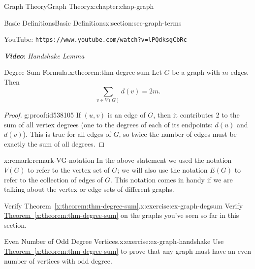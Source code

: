 \documentclass[oneside,10pt,]{book}
\newcommand{\xreffont}{\relax}
\newcommand{\mono}[1]{\texttt{#1}}
\newcommand{\alert}[1]{\textbf{\textit{#1}}}
\numberwithin{equation}{section}
\newlength{\qrsize}
\newlength{\previewwidth}
\begin{document}
\begin{chapterptx}{Graph Theory}{}{Graph Theory}{}{}{x:chapter:chap-graph}
\begin{sectionptx}{Basic Definitions}{}{Basic Definitions}{}{}{x:section:sec-graph-terms}
\begin{sidebyside}{1}{0}{0}{0}
\begin{sbspanel}{1}
\begin{tcbraster}[raster columns=2, raster column skip=1pt, raster halign=center, raster force size=false, raster left skip=0pt, raster right skip=0pt]
\begin{tcolorbox}[previewstyle, width=\previewwidth]
\end{tcolorbox}%
\begin{tcolorbox}[qrstyle]%
{\hypersetup{urlcolor=black}}%
\end{tcolorbox}%
\begin{tcolorbox}[captionstyle]%
\small YouTube: \mono{https://www.youtube.com/watch?v=lPQdksgCbRc}\end{tcolorbox}%
\end{tcbraster}%
\end{sbspanel}%
\end{sidebyside}%
\par
\alert{Video}: \emph{Handshake Lemma}%
\begin{theorem}{Degree-Sum Formula.}{}{x:theorem:thm-degree-sum}%
Let \(G\) be a graph with \(m\) edges. Then%
\begin{equation*}
\sum_{v \in V(G)} d(v) = 2m\text{.}
\end{equation*}
%
\end{theorem}
\begin{proof}{}{g:proof:id538105}
If \((u,v)\) is an edge of \(G\), then it contributes 2 to the sum of all vertex degrees (one to the degrees of each of its endpoints: \(d(u)\) and \(d(v)\)). This is true for all edges of \(G\), so twice the number of edges must be exactly the sum of all degrees.%
\end{proof}
\begin{remark}{}{x:remark:remark-VG-notation}%
In the above statement we used the notation \(V(G)\) to refer to the vertex set of \(G\); we will also use the notation \(E(G)\) to refer to the collection of edges of \(G\). This notation comes in handy if we are talking about the vertex or edge sets of different graphs. \label{g:notation:id538132}\label{g:notation:id538136}%
\end{remark}
\begin{inlineexercise}{Verify Theorem~{\xreffont\ref*{x:theorem:thm-degree-sum}}.}{x:exercise:ex-graph-degsum}%
Verify \hyperref[x:theorem:thm-degree-sum]{Theorem~{\xreffont\ref{x:theorem:thm-degree-sum}}} on the graphs you've seen so far in this section.%
\end{inlineexercise}%
\begin{inlineexercise}{Even Number of Odd Degree Vertices.}{x:exercise:ex-graph-handshake}%
Use \hyperref[x:theorem:thm-degree-sum]{Theorem~{\xreffont\ref{x:theorem:thm-degree-sum}}} to prove that any graph must have an even number of vertices with odd degree.%

\end{inlineexercise}
\end{sectionptx}
\end{chapterptx}
\end{document}
